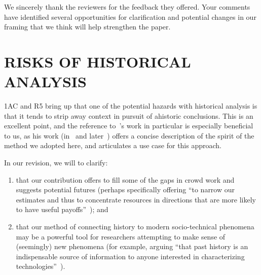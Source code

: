 \documentclass[11pt]{article}
\begin{document}
We sincerely thank the reviewers for the feedback they offered. Your comments have identified several opportunities for clarification and potential changes in our framing that we think will help strengthen the paper.

\section*{RISKS OF HISTORICAL ANALYSIS}
1AC and R5 bring up that one of the potential hazards with
historical analysis is that
it tends to strip away context in pursuit of ahistoric conclusions.
This is an excellent point, and
the reference to~\citeauthor{rosenberg1994exploring}'s
work in particular is especially beneficial to us, as his work
(in~\citeyear{rosenberg1982inside} and later~\citeyear{rosenberg1994exploring})
offers a concise description of the spirit of the method we adopted here,
and articulates a use case for this approach.

In our revision, we will to clarify:
\begin{enumerate}
  \item that our contribution offers to fill some of the gaps in crowd work and suggests potential futures
        (perhaps specifically offering
            ``to narrow our estimates
              and thus to concentrate resources
              in directions that are more likely to have useful payoffs''~\cite{rosenberg1994exploring});
  and
  \item that our method of connecting history to modern socio-technical phenomena may be
        a powerful tool for researchers attempting
        to make sense of (seemingly) new phenomena
        (for example,
        arguing ``that past history is
                  an indispensable source of information
                  to anyone interested in characterizing technologies''~\cite{rosenberg1982inside}).
\end{enumerate}


\end{document}

